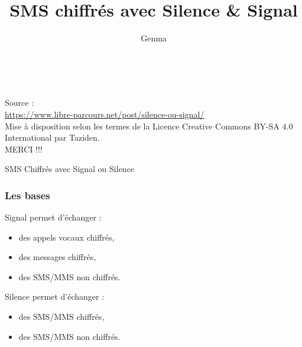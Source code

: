 \documentclass{beamer}
\title[SMS chiffrés avec Silence \& Signal]{SMS chiffrés avec Silence \& Signal}
\author{Genma}
\begin{document}
\begin{frame}
	\titlepage
	\vfill
	\begin{center}
		\\[2.5ex]
		{\tiny\CcNote{\CcLongnameByNcSa}}
		\vspace*{-2.5ex}
	\end{center}
\end{frame}
\begin{frame}
Source : 
\\ \url{https://www.libre-parcours.net/post/silence-ou-signal/}
\\ Mise à disposition selon les termes de la Licence Creative Commons BY-SA 4.0 International
par Taziden. 
\\ MERCI !!!
\end{frame}

\begin{frame}
\Huge{\centerline{SMS Chiffrés avec Signal ou Silence}}
\end{frame}

\begin{frame}
\frametitle{Les bases}

\begin{block}{Signal permet d’échanger :}
\begin{itemize}
\item des appels vocaux chiffrés,
\item des messages chiffrés,
\item des SMS/MMS non chiffrés.
\end{itemize}
\end{block}

\begin{block}{Silence permet d’échanger :}
\begin{itemize}
\item des SMS/MMS chiffrés,
\item des SMS/MMS non chiffrés.
\end{itemize}
\end{block}
\end{frame}
\end{document}
